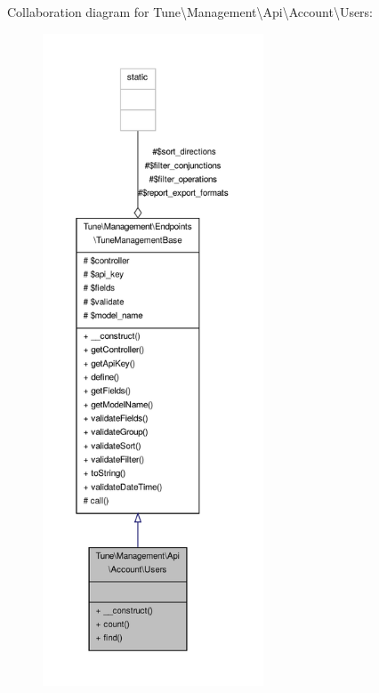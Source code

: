Collaboration diagram for Tune\textbackslash{}Management\textbackslash{}Api\textbackslash{}Account\textbackslash{}Users\-:
\nopagebreak
\begin{figure}[H]
\begin{center}
\leavevmode
\includegraphics[height=550pt]{classTune_1_1Management_1_1Api_1_1Account_1_1Users__coll__graph}
\end{center}
\end{figure}
